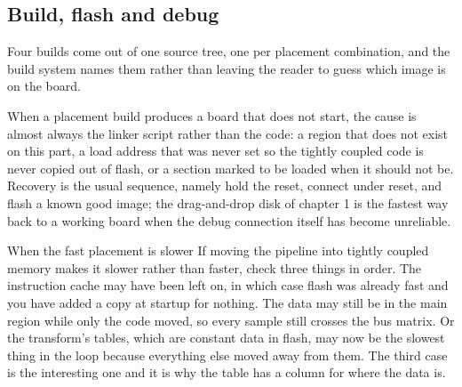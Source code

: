 \subsection*{Build, flash and debug}


Four builds come out of one source tree, one per placement combination, and the
build system names them rather than leaving the reader to guess which image is
on the board.


When a placement build produces a board that does not start, the cause is
almost always the linker script rather than the code: a region that does not
exist on this part, a load address that was never set so the tightly coupled
code is never copied out of flash, or a section marked to be loaded when it
should not be. Recovery is the usual sequence, namely hold the reset, connect
under reset, and flash a known good image; the drag-and-drop disk of chapter 1
is the fastest way back to a working board when the debug connection itself has
become unreliable.

\begin{note}{When the fast placement is slower}
If moving the pipeline into tightly coupled memory makes it slower rather than
faster, check three things in order. The instruction cache may have been left
on, in which case flash was already fast and you have added a copy at startup
for nothing. The data may still be in the main region while only the code
moved, so every sample still crosses the bus matrix. Or the transform's tables,
which are constant data in flash, may now be the slowest thing in the loop
because everything else moved away from them. The third case is the interesting
one and it is why the table has a column for where the data is.
\end{note}

